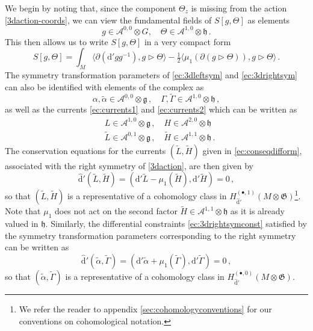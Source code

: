 \documentclass[11pt]{amsart}
\newcommand{\dr}{{\mathrm{d}}}
\newcommand{\fg}{\mathfrak{g}}
\newcommand{\fh}{\mathfrak{h}}
\newcommand{\fG}{\mathfrak{G}}
\numberwithin{equation}{section}
\numberwithin{figure}{section}
\numberwithin{table}{section}
\newcommand{\cA}{\mathcal{A}}
\theoremstyle{thm}
\numberwithin{equation}{subsection}
\theoremstyle{definition}
\theoremstyle{rem}
\begin{document}
We begin by noting that, since the component $\Theta_z$ is missing from the action \eqref{3daction-coords}, we can view the fundamental fields of $S[g,\Theta]$ as elements
\begin{equation*}
    g\in \cA^{0,0}\otimes G,\quad \Theta\in \cA^{1,0}\otimes \fh\,.
\end{equation*}
This then allows us to write $S[g,\Theta]$ in  a very compact form
\begin{equation}
  S[g,\Theta]= \int_{M}\langle \partial (\dr'gg^{-1}),g\rhd \Theta\rangle - \tfrac{1}{2}\langle \mu_1(\partial (g\rhd\Theta)),g\rhd\Theta\rangle\,.\label{3daction}
\end{equation}
The symmetry transformation parameters of \eqref{ec:3dleftsym} and \eqref{ec:3drightsym} can also be identified with elements of the complex as 
\begin{equation}
    \alpha,\tilde \alpha \in \cA^{0,0}\otimes \fg \,,\quad \Gamma,\tilde\Gamma \in \cA^{1,0}\otimes \fh \,,
\end{equation}
as well as the currents \eqref{ec:currents1} and \eqref{ec:currents2} which can be  written as
\begin{align}
        & L \in \mathcal{A}^{1,0}\otimes \fg\,,\quad H\in\mathcal{A}^{2,0}\otimes \fh\\
        & \tilde L \in\mathcal{A}^{0,1}\otimes \fg\,,\quad \tilde H \in\mathcal{A}^{1,1}\otimes \fh\,.
\end{align}
The conservation equations for the currents \((\tilde{L}, \tilde{H})\) given in \eqref{ec:conseqdifform}, associated with the right symmetry of \eqref{3daction}, are then given by 
\begin{equation}
\label{ec:currentsincoho}
    \hat\dr' (\tilde L, \tilde H) = (\dr'\tilde L - \mu_1 (\tilde H)
    , \dr' \tilde H) = 0 \,,
\end{equation}
so that $(\tilde L,\tilde H)$ is a representative of a cohomology class in $ H_{\hat \dr'}^{(\bullet,1)}(M\otimes \fG)$\footnote{We refer the reader to appendix \ref{sec:cohomologyconventions} for our conventions on cohomological notation.}. Note that $\mu_1$ does not act on the second factor $\tilde H \in \cA^{1,1}\otimes \fh$ as it is already valued in $\fh$. Similarly, the differential constraints \eqref{ec:3drightsymconst} satisfied by the symmetry transformation parameters corresponding to the right symmetry can be written as
\begin{equation}
\label{ec:paramincoho}
    \hat \dr' (\tilde \alpha,\tilde \Gamma) = (\dr'\tilde \alpha + \mu_1(\tilde \Gamma),\dr' \tilde \Gamma)=0 \,,
\end{equation}
so that $(\tilde \alpha, \tilde \Gamma)$ is a representative of a cohomology class in $H^{(\bullet,0)}_{\hat \dr'}(M\otimes \fG)$. 
\end{document}
